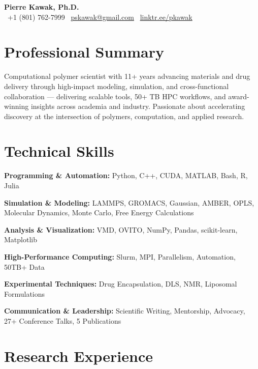 \documentclass[letterpaper,12pt]{article}
\begin{document}
\begin{center}
  {\LARGE \textbf{Pierre Kawak, Ph.D.}}\\
  \faPhone\ +1 (801) 762-7999 \quad \faEnvelope\ \href{mailto:pskawak@gmail.com}{pskawak@gmail.com} \quad \faLink\ \href{https://linktr.ee/pkawak}{linktr.ee/pkawak}
\end{center}

\vspace{-0.3\baselineskip}
\section*{Professional Summary}
Computational polymer scientist with 11+ years advancing materials and drug delivery through high-impact modeling, simulation, and cross-functional collaboration — delivering scalable tools, 50+ TB HPC workflows, and award-winning insights across academia and industry. Passionate about accelerating discovery at the intersection of polymers, computation, and applied research.

\vspace{-0.3\baselineskip}
\section*{Technical Skills}
\begin{tabitemize}[leftmargin=*]
  \item \textbf{Programming \& Automation:} Python, C++, CUDA, MATLAB, Bash, R, Julia
  \item \textbf{Simulation \& Modeling:} LAMMPS, GROMACS, Gaussian, AMBER, OPLS, Molecular Dynamics, Monte Carlo, Free Energy Calculations
  \item \textbf{Analysis \& Visualization:} VMD, OVITO, NumPy, Pandas, scikit-learn, Matplotlib
  \item \textbf{High-Performance Computing:} Slurm, MPI, Parallelism, Automation, 50TB+ Data
  \item \textbf{Experimental Techniques:} Drug Encapsulation, DLS, NMR, Liposomal Formulations
  \item \textbf{Communication \& Leadership:} Scientific Writing, Mentorship, Advocacy, 27+ Conference Talks, 5 Publications
\end{tabitemize}

\vspace{-0.3\baselineskip}
\section*{Research Experience}
\end{document}
